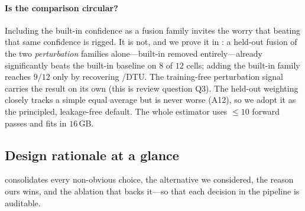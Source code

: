 \paragraph{Is the comparison circular?} Including the built-in confidence as a fusion family invites
the worry that beating that same confidence is rigged. It is not, and we prove it in
: a held-out fusion of the two \emph{perturbation} families alone---built-in
removed entirely---already significantly beats the built-in baseline on $8$ of $12$ cells; adding the
built-in family reaches $9/12$ only by recovering \pii/DTU. The training-free perturbation signal
carries the result on its own (this is review question Q3). The held-out weighting closely tracks a
simple equal average but is never worse (A12), so we adopt it as the principled, leakage-free default.
The whole estimator uses $\le 10$ forward passes and fits in $16$\,GB.

\subsection{Design rationale at a glance}
\label{sec:method-rationale}

 consolidates every non-obvious choice, the alternative we considered, the reason
ours wins, and the ablation that backs it---so that each decision in the pipeline is auditable.

